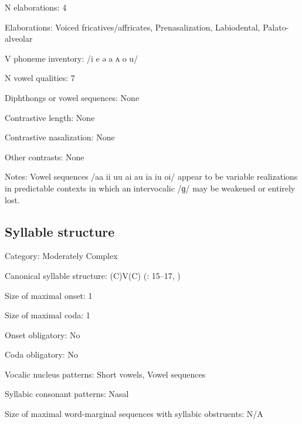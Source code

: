 {\begin{appendixdesc}
\item[N elaborations:] 4

\item[Elaborations:] Voiced fricatives/affricates, Prenasalization, Labiodental, Palato-alveolar

\item[V phoneme inventory:] /i e ə a ʌ o u/

\item[N vowel qualities:] 7

\item[Diphthongs or vowel sequences:] None

\item[Contrastive length:] None

\item[Contrastive nasalization:] None

\item[Other contrasts:] None

\item[Notes:] Vowel sequences /aa ii uu ai au ia iu oi/ appear to be variable realizations in predictable contexts in which an intervocalic /ɡ/ may be weakened or entirely lost.
\end{appendixdesc}
\subsection*{Syllable structure}
\begin{appendixdesc}

\item[Category:] Moderately Complex

\item[Canonical syllable structure:] (C)V(C) (\citealt{Hutchison1981}: 15--17, \citealt{Cyffer1998})

\item[Size of maximal onset:] 1

\item[Size of maximal coda:] 1

\item[Onset obligatory:] No

\item[Coda obligatory:] No

\item[Vocalic nucleus patterns:] Short vowels, Vowel sequences

\item[Syllabic consonant patterns:] Nasal

\item[Size of maximal word-marginal sequences with syllabic obstruents:] N/A


\end{appendixdesc}}
